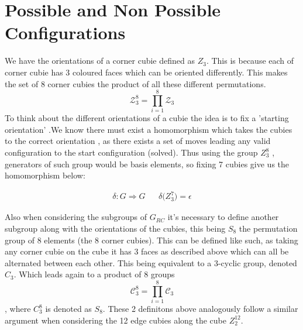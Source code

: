 \documentclass{article}
\newcounter{lem}[section]\setcounter{lem}{0}
\begin{document}


\pagebreak
\section{Possible and Non Possible Configurations}


We have the orientations of a corner cubie defined as $Z_3$.
This is because each of corner cubie has 3 coloured faces which can be oriented differently. 
This makes the set of 8 corner cubies the product of all these different permutations.\[\mathcal{Z}_{3}^8 = \prod_{i=1}^{8}\mathcal{Z}_{3}\]
To think about the different orientations of a cubie the idea is to fix a 'starting orientation' .We know there must exist a homomorphism which takes the cubies to the correct orientation , as there exists a set of moves leading any valid configuration to the start configuration (solved). Thus using the group $Z_{3}^{8}$ , generators of such group would be basis elements,  so fixing 7 cubies  give us the homomorphism below: 

\begin{align}
	\delta : G \Rightarrow G && \delta\mathcal({Z}_{3}^{7}) = \epsilon
\end{align}

Also when considering the subgroups of $G_{RC}$ it's necessary to define another subgroup along with the orientations of the cubies, this being $S_{8}$ the permutation group of 8 elements (the 8 corner cubies). This can be defined like such, as taking any corner cubie on the cube it has 3 faces as described above which can all be alternated between each other. This being equivalent to a 3-cyclic group, denoted $C_{3}$. Which leads again to a product of 8 groups \[\mathcal{C}_{3}^8 = \prod_{i=1}^{8}\mathcal{C}_{3}\], where $C_{3}^{8}$ is denoted as $S_{8}$. These 2 definitons above analogously follow a similar argument when considering the 12 edge cubies along the cube $Z^{12}_{2}$.
\end{document}
